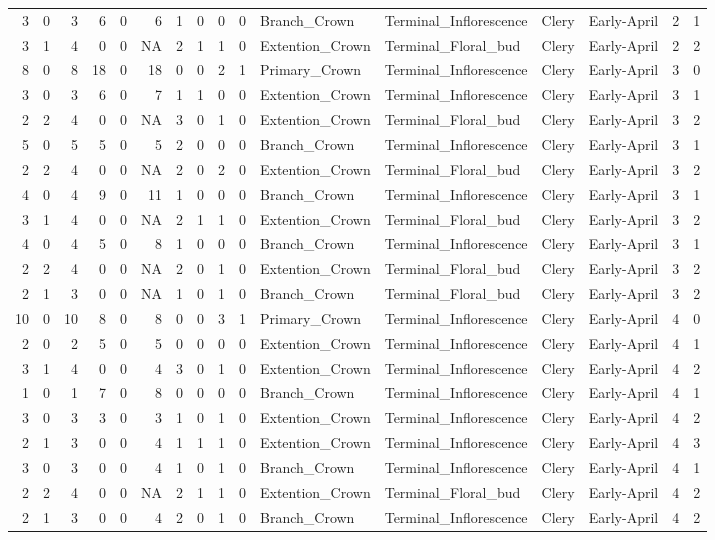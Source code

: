 \documentclass[]{article}
\begin{document}
\begin{longtable}[]{@{}rrrrrrrrrrllllrl@{}}
3 & 0 & 3 & 6 & 0 & 6 & 1 & 0 & 0 & 0 & Branch\_Crown &
Terminal\_Inflorescence & Clery & Early-April & 2 & 1\tabularnewline
3 & 1 & 4 & 0 & 0 & NA & 2 & 1 & 1 & 0 & Extention\_Crown &
Terminal\_Floral\_bud & Clery & Early-April & 2 & 2\tabularnewline
8 & 0 & 8 & 18 & 0 & 18 & 0 & 0 & 2 & 1 & Primary\_Crown &
Terminal\_Inflorescence & Clery & Early-April & 3 & 0\tabularnewline
3 & 0 & 3 & 6 & 0 & 7 & 1 & 1 & 0 & 0 & Extention\_Crown &
Terminal\_Inflorescence & Clery & Early-April & 3 & 1\tabularnewline
2 & 2 & 4 & 0 & 0 & NA & 3 & 0 & 1 & 0 & Extention\_Crown &
Terminal\_Floral\_bud & Clery & Early-April & 3 & 2\tabularnewline
5 & 0 & 5 & 5 & 0 & 5 & 2 & 0 & 0 & 0 & Branch\_Crown &
Terminal\_Inflorescence & Clery & Early-April & 3 & 1\tabularnewline
2 & 2 & 4 & 0 & 0 & NA & 2 & 0 & 2 & 0 & Extention\_Crown &
Terminal\_Floral\_bud & Clery & Early-April & 3 & 2\tabularnewline
4 & 0 & 4 & 9 & 0 & 11 & 1 & 0 & 0 & 0 & Branch\_Crown &
Terminal\_Inflorescence & Clery & Early-April & 3 & 1\tabularnewline
3 & 1 & 4 & 0 & 0 & NA & 2 & 1 & 1 & 0 & Extention\_Crown &
Terminal\_Floral\_bud & Clery & Early-April & 3 & 2\tabularnewline
4 & 0 & 4 & 5 & 0 & 8 & 1 & 0 & 0 & 0 & Branch\_Crown &
Terminal\_Inflorescence & Clery & Early-April & 3 & 1\tabularnewline
2 & 2 & 4 & 0 & 0 & NA & 2 & 0 & 1 & 0 & Extention\_Crown &
Terminal\_Floral\_bud & Clery & Early-April & 3 & 2\tabularnewline
2 & 1 & 3 & 0 & 0 & NA & 1 & 0 & 1 & 0 & Branch\_Crown &
Terminal\_Floral\_bud & Clery & Early-April & 3 & 2\tabularnewline
10 & 0 & 10 & 8 & 0 & 8 & 0 & 0 & 3 & 1 & Primary\_Crown &
Terminal\_Inflorescence & Clery & Early-April & 4 & 0\tabularnewline
2 & 0 & 2 & 5 & 0 & 5 & 0 & 0 & 0 & 0 & Extention\_Crown &
Terminal\_Inflorescence & Clery & Early-April & 4 & 1\tabularnewline
3 & 1 & 4 & 0 & 0 & 4 & 3 & 0 & 1 & 0 & Extention\_Crown &
Terminal\_Inflorescence & Clery & Early-April & 4 & 2\tabularnewline
1 & 0 & 1 & 7 & 0 & 8 & 0 & 0 & 0 & 0 & Branch\_Crown &
Terminal\_Inflorescence & Clery & Early-April & 4 & 1\tabularnewline
3 & 0 & 3 & 3 & 0 & 3 & 1 & 0 & 1 & 0 & Extention\_Crown &
Terminal\_Inflorescence & Clery & Early-April & 4 & 2\tabularnewline
2 & 1 & 3 & 0 & 0 & 4 & 1 & 1 & 1 & 0 & Extention\_Crown &
Terminal\_Inflorescence & Clery & Early-April & 4 & 3\tabularnewline
3 & 0 & 3 & 0 & 0 & 4 & 1 & 0 & 1 & 0 & Branch\_Crown &
Terminal\_Inflorescence & Clery & Early-April & 4 & 1\tabularnewline
2 & 2 & 4 & 0 & 0 & NA & 2 & 1 & 1 & 0 & Extention\_Crown &
Terminal\_Floral\_bud & Clery & Early-April & 4 & 2\tabularnewline
2 & 1 & 3 & 0 & 0 & 4 & 2 & 0 & 1 & 0 & Branch\_Crown &
Terminal\_Inflorescence & Clery & Early-April & 4 & 2\tabularnewline

\end{longtable}
\end{document}
